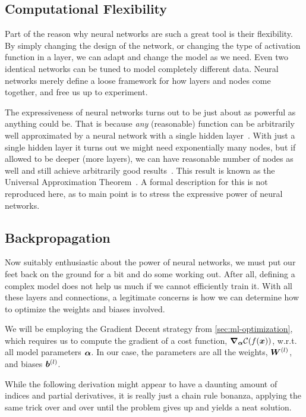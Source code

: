 \documentclass[Thesis.tex]{subfiles}
\begin{document}
\subsection{Computational Flexibility}

Part of the reason why neural networks are such a great tool is their
flexibility. By simply changing the design of the network, or changing the type
of activation function in a layer, we can adapt and change the model as we need.
Even two identical networks can be tuned to model completely different data.
Neural networks merely define a loose framework for how layers and nodes come
together, and free us up to experiment.

The expressiveness of neural networks turns out to be just about as powerful as
anything could be. That is because \emph{any} (reasonable) function can be
arbitrarily well approximated by a neural network with a single hidden
layer~\cite{Cybenko-1989}. With just a single hidden layer it turns out we might
need exponentially many nodes, but if allowed to be deeper (more layers), we can
have reasonable number of nodes as well and still achieve arbitrarily good
results~\cite{Hanin-2017}. This result is known as the Universal Approximation
Theorem~\cite{Cybenko-1989, Hanin-2017}. A formal description for this is not
reproduced here, as to main point is to stress the expressive power of
neural networks.


\subsection{Backpropagation}
\label{sec:ml-backprop}

Now suitably enthusiastic about the power of neural networks, we must put our
feet back on the ground for a bit and do some working out. After all, defining a
complex model does not help us much if we cannot efficiently train it. With all
these layers and connections, a legitimate concerns is how we can determine how
to optimize the weights and biases involved.

We will be employing the Gradient Decent strategy from \cref{sec:ml-optimization},
which requires us to compute the gradient of a cost function,
$\grad_{\bm{\alpha}}\mathcal{C}(f(\bm{x}))$, w.r.t. all model parameters $\bm{\alpha}$. In
our case, the parameters are all the weights, $\bm{W}^{(l)}$, and biases $\bm{b}^{(l)}$.

While the following derivation might appear to have a daunting amount of indices
and partial derivatives, it is really just a chain rule bonanza, applying the
same trick over and over until the problem gives up and yields a neat
solution.
\end{document}
